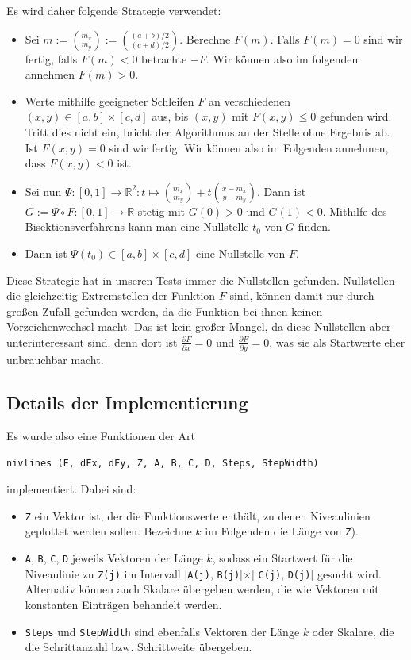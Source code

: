 \documentclass[a4paper,11pt,bibliography=totoc,listof=totoc,headinclude=true,cleardoublepage=empty,oneside]{scrartcl}
\newcommand{\R}{\mathbb{R}}
\newcommand{\diff}[2]{\frac{\partial #1}{\partial #2}}
\begin{document}
Es wird daher folgende Strategie verwendet:
\begin{itemize}
	\item Sei $m:= \binom{m_x}{m_y} := \binom{(a+b)/2}{(c+d)/2}$. Berechne $F(m)$. Falls $F(m)=0$ sind wir fertig, falls $F(m)<0$ betrachte $-F$. Wir können also im folgenden annehmen $F(m)>0$.
	\item Werte mithilfe geeigneter Schleifen $F$ an verschiedenen $(x,y) \in [a,b]\times [c,d]$ aus, bis $(x,y)$ mit $F(x,y)\le 0$ gefunden wird. Tritt dies nicht ein, bricht der Algorithmus an der Stelle ohne Ergebnis ab. Ist $F(x,y)=0$ sind wir fertig. Wir können also im Folgenden annehmen, dass $F(x,y)<0$ ist.
	\item Sei nun $\Psi : [0,1] \to \R^2 : t \mapsto \binom{m_x}{m_y} + t \binom{x-m_x}{y-m_y}$. Dann ist $ G:= \Psi \circ F : [0,1] \to \R$ stetig mit $G(0)>0$ und $G(1)<0$. Mithilfe des Bisektionsverfahrens kann man eine Nullstelle $t_0$ von $G$ finden.
	\item Dann ist $\Psi(t_0) \in [a,b] \times [c,d]$ eine Nullstelle von $F$.
\end{itemize} 
Diese Strategie hat in unseren Tests immer die Nullstellen gefunden. Nullstellen die gleichzeitig Extremstellen der Funktion $F$ sind, können damit nur durch großen Zufall gefunden werden, da die Funktion bei ihnen keinen Vorzeichenwechsel macht. Das ist kein großer Mangel, da diese Nullstellen aber unterinteressant sind, denn dort ist $\diff{F}{x}=0$ und $\diff{F}{y}=0$, was sie als Startwerte eher unbrauchbar macht.

\subsection{Details der Implementierung}

Es wurde also eine Funktionen der Art
\begin{verbatim}
nivlines (F, dFx, dFy, Z, A, B, C, D, Steps, StepWidth)
\end{verbatim}
implementiert. Dabei sind:
\begin{itemize}
	\item \verb|Z| ein Vektor ist, der die Funktionswerte enthält, zu denen Niveaulinien geplottet werden sollen. Bezeichne $k$ im Folgenden die Länge von \verb|Z|).
	\item \verb|A|, \verb|B|, \verb|C|, \verb|D| jeweils Vektoren der Länge $k$, sodass ein Startwert für die Niveaulinie zu \verb|Z(j)| im Intervall [\verb|A(j)|, \verb|B(j)|]$\times$[ \verb|C(j)|, \verb|D(j)|] gesucht wird. Alternativ können auch Skalare übergeben werden, die wie Vektoren mit konstanten Einträgen behandelt werden.
	\item  \verb|Steps| und \verb|StepWidth| sind ebenfalls Vektoren der Länge $k$ oder Skalare, die die Schrittanzahl bzw. Schrittweite übergeben.
\end{itemize}
\end{document}
